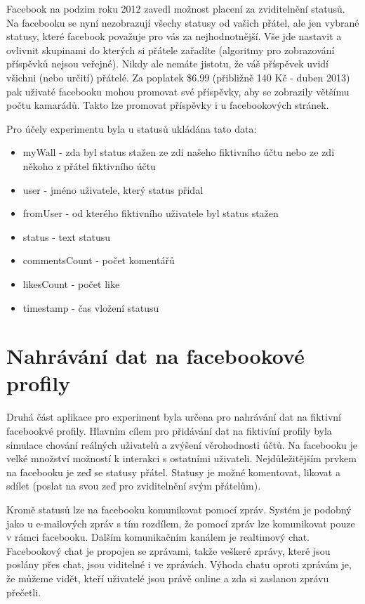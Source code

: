 \documentclass[thesis=M,czech]{FITthesis}[2013/05/10]
\begin{document}
Facebook na podzim roku 2012 zavedl možnost placení za zviditelnění statusů. Na facebooku se nyní nezobrazují všechy statusy od vašich přátel, ale jen vybrané statusy, které facebook považuje pro vás za nejhodnotnější. Vše jde nastavit a ovlivnit skupinami do kterých si přátele zařadíte (algoritmy pro zobrazování příspěvků nejsou veřejné). Nikdy ale nemáte jistotu, že váš příspěvek uvidí všichni (nebo určití) přátelé. Za poplatek \$6.99 (přibližně 140 Kč - duben 2013) pak uživaté facebooku mohou promovat své příspěvky, aby se zobrazily většímu počtu kamarádů. Takto lze promovat příspěvky i u facebookových stránek.

Pro účely experimentu byla u statusů ukládána tato data:

\begin{itemize}
  \item myWall - zda byl status stažen ze zdi našeho fiktivního účtu nebo ze zdi někoho z přátel fiktivního účtu
  \item user - jméno uživatele, který status přidal
  \item fromUser - od kterého fiktivního uživatele byl status stažen  
  \item status - text statusu
  \item commentsCount - počet komentářů
  \item likesCount - počet like
  \item timestamp - čas vložení statusu
\end{itemize}


\section{Nahrávání dat na facebookové profily}

Druhá část aplikace pro experiment byla určena pro nahrávání dat na fiktivní facebookvé profily. Hlavním cílem pro přidávání dat na fiktivíní profily byla simulace chování reálných uživatelů a zvýšení věrohodnosti účtů. Na facebooku je velké množství možností k interakci s ostatními uživateli. Nejdůležitějším prvkem na facebooku je zeď se statusy přátel. Statusy je možné komentovat, likovat a sdílet (poslat na svou zeď pro zviditelnění svým přátelům). 

Kromě statusů lze na facebooku komunikovat pomocí zpráv. Systém je podobný jako u e-mailových zpráv s tím rozdílem, že pomocí zpráv lze komunikovat pouze  v rámci facebooku. Dalším komunikačním kanálem je realtimový chat. Facebookový chat je propojen se zprávami, takže veškeré zprávy, které jsou poslány přes chat, jsou viditelné i ve zprávách. Výhoda chatu oproti zprávám je, že  můžeme vidět, kteří uživatelé jsou právě online a zda si zaslanou zprávu přečetli.
\end{document}
